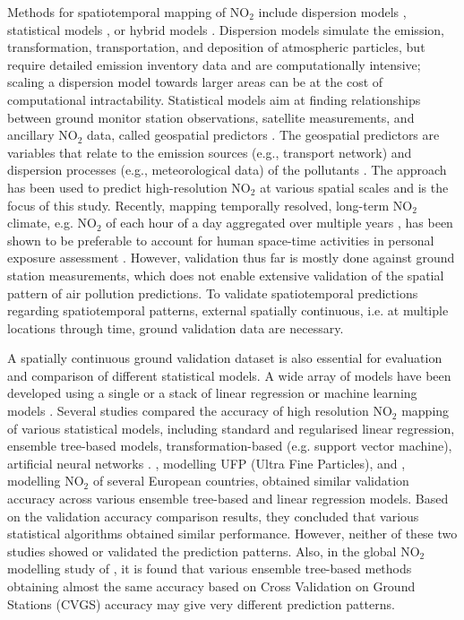 \documentclass{article}
\begin{document}
Methods for spatiotemporal mapping of NO$_2$ include dispersion models \citep{holmes2006review, health2010traffic}, statistical models \citep{chen2019comparison}, or hybrid models \citep{molter2010modelling,marshall2008within,beelen2010comparison,dijkema2010comparison, akita2014large}. Dispersion models simulate the emission, transformation, transportation, and deposition of atmospheric particles, but require detailed emission inventory data and are computationally intensive; scaling a dispersion model towards larger areas can be at the cost of computational intractability. Statistical models aim at finding relationships between ground monitor station observations, satellite measurements, and ancillary NO$_2$ data, called geospatial predictors \citep{rivera2013nitrogen, park2017individual,kharol2015assessment, isiugo2018assessing, chen2019comparison,luglobal}. The geospatial predictors are variables that relate to the emission sources (e.g., transport network) and dispersion processes (e.g., meteorological data) of the pollutants \citep{briggs2000regression}. The approach has been used to predict high-resolution NO$_2$ at various spatial scales \citep{Hoek2008,larkin2017global} and is the focus of this study.  Recently, mapping temporally resolved, long-term NO$_2$ climate, e.g. NO$_2$ of each hour of a day aggregated over multiple years \citep{lu2020land}, has been shown to be preferable to account for human space-time activities in personal exposure assessment \citep{lu2019}. However, validation thus far is mostly done against ground station measurements, which does not enable extensive validation of the spatial pattern of air pollution predictions. To validate spatiotemporal predictions regarding spatiotemporal patterns, external spatially continuous, i.e. at multiple locations through time, ground validation data are necessary.

A spatially continuous ground validation dataset is also essential for evaluation and comparison of different statistical models. A wide array of models have been developed using a single or a stack of linear regression \citep{briggs2000regression} or machine learning models \citep{kees2020satelliteML}. Several studies compared the accuracy of high resolution NO$_2$ mapping of various statistical models, including standard and regularised linear regression, ensemble tree-based models, transformation-based (e.g. support vector machine), artificial neural networks \citep{chen2019comparison, kerckhoffs2019performance, luglobal}. \cite{kerckhoffs2019performance}, modelling UFP (Ultra Fine Particles), and \cite{chen2019comparison}, modelling NO$_2$ of several European countries, obtained similar validation accuracy across various ensemble tree-based and linear regression models. Based on the validation accuracy comparison results, they concluded that various statistical algorithms obtained similar performance. However, neither of these two studies showed or validated the prediction patterns. Also, in the global NO$_2$ modelling study of \cite{luglobal}, it is found that various ensemble tree-based methods obtaining almost the same accuracy based on Cross Validation on Ground Stations (CVGS) accuracy may give very different prediction patterns.  
\end{document}
